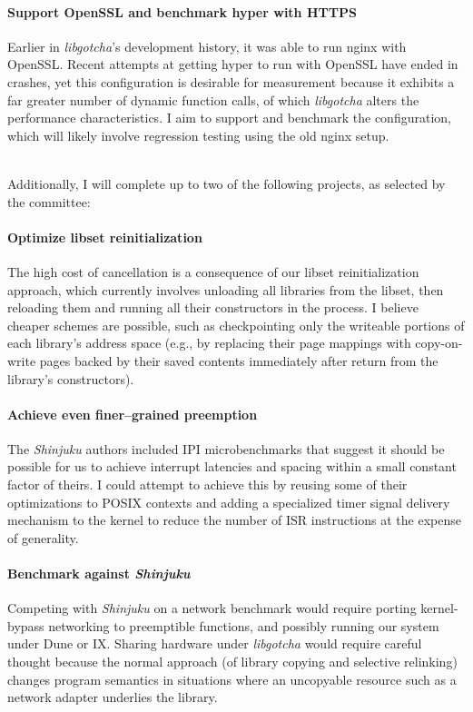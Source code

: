 \documentclass[12pt,letterpaper,openright]{report}
\begin{document}
\paragraph{Support OpenSSL and benchmark hyper with HTTPS}
Earlier in \textit{libgotcha}'s development history, it was able to run nginx with
OpenSSL.  Recent attempts at getting hyper to run with OpenSSL have ended in crashes,
yet this configuration is desirable for measurement because it exhibits a far greater
number of dynamic function calls, of which \textit{libgotcha} alters the performance
characteristics.  I aim to support and benchmark the configuration, which will likely
involve regression testing using the old nginx setup.

\hfill \\
\noindent
Additionally, I will complete up to two of the following projects, as selected by the
committee:

\paragraph{Optimize libset reinitialization}
The high cost of cancellation is a consequence of our libset reinitialization
approach, which currently involves unloading all libraries from the libset, then
reloading them and running all their constructors in the process.  I believe cheaper
schemes are possible, such as checkpointing only the writeable portions of each
library's address space (e.g., by replacing their page mappings with copy-on-write
pages backed by their saved contents immediately after return from the library's
constructors).

\paragraph{Achieve even finer--grained preemption}
The \textit{Shinjuku} authors included IPI microbenchmarks that suggest it should be
possible for us to achieve interrupt latencies and spacing within a small constant
factor of theirs.  I could attempt to achieve this by reusing some of their
optimizations to POSIX contexts and adding a specialized timer signal delivery
mechanism to the kernel to reduce the number of ISR instructions at the expense of
generality.

\paragraph{Benchmark against \textit{Shinjuku}}
Competing with \textit{Shinjuku} on a network benchmark would require porting
kernel-bypass networking to preemptible functions, and possibly running our system
under Dune or IX.  Sharing hardware under \textit{libgotcha} would require careful
thought because the normal approach (of library copying and selective relinking)
changes program semantics in situations where an uncopyable resource such as a
network adapter underlies the library.
\end{document}
